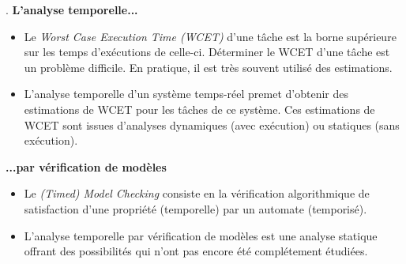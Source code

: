 \documentclass[final]{beamer}
\begin{document}
\begin{frame}
\begin{textblock}{39}
\begin{block}{\thesection. \secname}
        \textbf{L'analyse temporelle...}
        \begin{itemize}
          \item[] Le \textit{Worst Case Execution Time (WCET)} d'une tâche est
            la borne supérieure sur les temps d'exécutions de
            celle-ci. Déterminer le WCET d'une tâche est un problème
            difficile. En pratique, il est très souvent utilisé des estimations.
            \vspace{.5em}
          \item[] L'analyse temporelle d'un système temps-réel premet d'obtenir
            des estimations de WCET pour les tâches de ce système. Ces
            estimations de WCET sont issues d'analyses dynamiques (avec
            exécution) ou statiques (sans exécution).
        \end{itemize}
        \vspace{1em}

        \textbf{...par vérification de modèles}
        \begin{itemize}
          \item[] Le \textit{(Timed) Model Checking} consiste en la vérification
            algorithmique de satisfaction d'une propriété (temporelle) par un
            automate (temporisé).

          \item[] L'analyse temporelle par vérification de modèles est une
            analyse statique offrant des possibilités qui n'ont pas encore
            été complétement étudiées.
            \vspace{.5em}
            

\end{itemize}
\end{block}
\end{textblock}
\end{frame}
\end{document}
